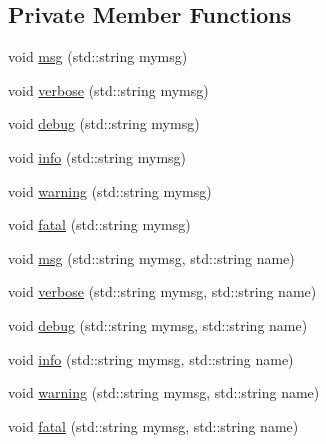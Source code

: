 \subsection*{Private Member Functions}
\begin{DoxyCompactItemize}
\item 
void \hyperlink{classDLL_a3a4774ae240e805b9c3ce18b7418d7cc}{msg} (std::string mymsg)
\item 
void \hyperlink{classDLL_a3b019cc98993af67fdc9b07b1921251b}{verbose} (std::string mymsg)
\item 
void \hyperlink{classDLL_ab3fb4a13b4308047d42b27b6943a47da}{debug} (std::string mymsg)
\item 
void \hyperlink{classDLL_a2b7ea0c85b83a1dec03e4fce13c0d5d2}{info} (std::string mymsg)
\item 
void \hyperlink{classDLL_a4bbc341bad623eedb5c228c91ce2e858}{warning} (std::string mymsg)
\item 
void \hyperlink{classDLL_a946b5d7e4b0b200b7acf190aa58bf9c4}{fatal} (std::string mymsg)
\item 
void \hyperlink{classDLL_a39585579e6dd045ee39cd74ebecc0525}{msg} (std::string mymsg, std::string name)
\item 
void \hyperlink{classDLL_a721fa58107b11bb96181219f06f517e3}{verbose} (std::string mymsg, std::string name)
\item 
void \hyperlink{classDLL_a681470b03d31aab77229bb2e3a72409c}{debug} (std::string mymsg, std::string name)
\item 
void \hyperlink{classDLL_ac7c5b201c76267167f3543d524d06046}{info} (std::string mymsg, std::string name)
\item 
void \hyperlink{classDLL_a0f7d876098d5dcd412989a3b2a5dadf3}{warning} (std::string mymsg, std::string name)
\item 
void \hyperlink{classDLL_ada1bec81505d4e419e995004a2eb180e}{fatal} (std::string mymsg, std::string name)
\end{DoxyCompactItemize}
